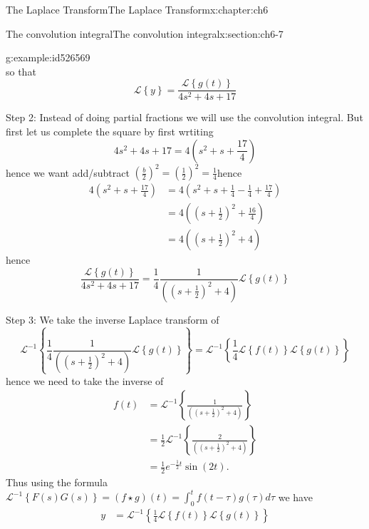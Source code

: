 \documentclass[oneside,10pt,]{book}
\numberwithin{equation}{section}
\numberwithin{equation}{section}
\newcommand{\amp}{&}
\begin{document}
\begin{chapterptx}{The Laplace Transform}{}{The Laplace Transform}{}{}{x:chapter:ch6}
\begin{sectionptx}{The convolution integral}{}{The convolution integral}{}{}{x:section:ch6-7}
\begin{example}{}{g:example:id526569}
\begin{equation*}
\end{equation*}
so that%
\begin{equation*}
\mathcal{L}\left\{ y\right\} =\frac{\mathcal{L}\left\{ g(t)\right\} }{4s^{2}+4s+17}
\end{equation*}
%
\par
Step 2: Instead of doing partial fractions we will use the convolution integral. But first let us complete the square by first wrtiting%
\begin{equation*}
4s^{2}+4s+17=4\left(s^{2}+s+\frac{17}{4}\right)
\end{equation*}
hence we want add\slash{}subtract \(\left(\frac{b}{2}\right)^{2}=\left(\frac{1}{2}\right)^{2}=\frac{1}{4}\)hence%
\begin{align*}
4\left(s^{2}+s+\frac{17}{4}\right) \amp =4\left(s^{2}+s+\frac{1}{4}-\frac{1}{4}+\frac{17}{4}\right)\\
\amp =4\left(\left(s+\frac{1}{2}\right)^{2}+\frac{16}{4}\right)\\
\amp =4\left(\left(s+\frac{1}{2}\right)^{2}+4\right)
\end{align*}
hence%
\begin{equation*}
\frac{\mathcal{L}\left\{ g(t)\right\} }{4s^{2}+4s+17}=\frac{1}{4}\frac{1}{\left(\left(s+\frac{1}{2}\right)^{2}+4\right)}\mathcal{L}\left\{ g(t)\right\} 
\end{equation*}
%
\par
Step 3: We take the inverse Laplace transform of%
\begin{equation*}
\mathcal{L}^{-1}\left\{ \frac{1}{4}\frac{1}{\left(\left(s+\frac{1}{2}\right)^{2}+4\right)}\mathcal{L}\left\{ g(t)\right\} \right\} =\mathcal{L}^{-1}\left\{ \frac{1}{4}\mathcal{L}\left\{ f(t)\right\} \mathcal{L}\left\{ g(t)\right\} \right\} 
\end{equation*}
hence we need to take the inverse of%
\begin{align*}
f(t) \amp =\mathcal{L}^{-1}\left\{ \frac{1}{\left(\left(s+\frac{1}{2}\right)^{2}+4\right)}\right\} \\
\amp =\frac{1}{2}\mathcal{L}^{-1}\left\{ \frac{2}{\left(\left(s+\frac{1}{2}\right)^{2}+4\right)}\right\} \\
\amp =\frac{1}{2}e^{-\frac{1}{2}t}\sin\left(2t\right).
\end{align*}
Thus using the formula \(\mathcal{L}^{-1}\left\{ F(s)G(s)\right\} =\left(f\star g\right)(t)=\int_{0}^{t}f\left(t-\tau\right)g\left(\tau\right)d\tau\) we have%
\begin{align*}
y \amp =\mathcal{L}^{-1}\left\{ \frac{1}{4}\mathcal{L}\left\{ f(t)\right\} \mathcal{L}\left\{ g(t)\right\} \right\} \\

\end{align*}
\end{example}
\end{sectionptx}
\end{chapterptx}
\end{document}
